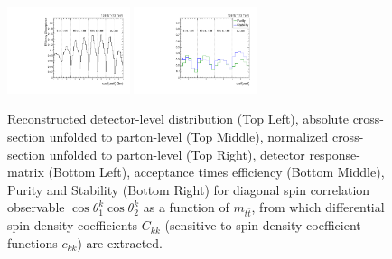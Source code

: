 \begin{figure}[htb]
\begin{center}
 \includegraphics[width=0.32\textwidth]{fig_fullRun2UL/unfolding/combined/TotEff_c_kk_mttbar.pdf}
 \includegraphics[width=0.32\textwidth]{fig_fullRun2UL/unfolding/combined/PurStab_c_kk_mttbar.pdf} \\
\caption{Reconstructed detector-level distribution (Top Left), absolute cross-section unfolded to parton-level (Top Middle), normalized cross-section unfolded to parton-level (Top Right), detector response-matrix (Bottom Left), acceptance times efficiency (Bottom Middle), Purity and Stability (Bottom Right) for diagonal spin correlation observable $\cos\theta_{1}^{k}\cos\theta_{2}^{k}$ as a function of $m_{t\bar{t}}$, from which differential spin-density coefficients $C_{kk}$ (sensitive to spin-density coefficient functions $c_{k k}$) are extracted.}
\label{fig:c_kk_mttbar}
\end{center}
\end{figure}
\clearpage
